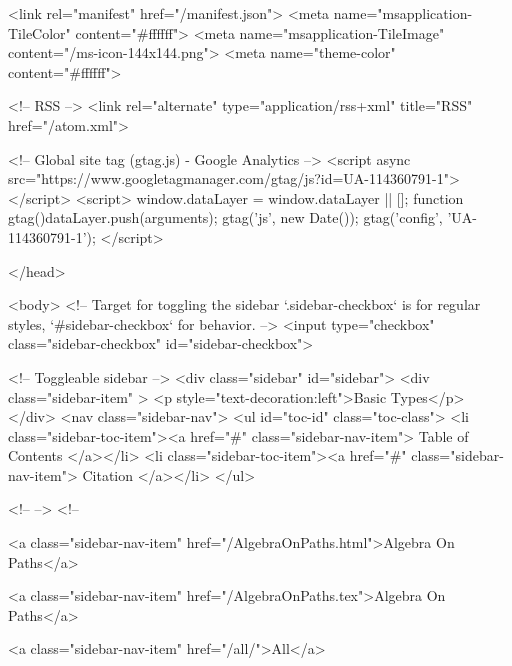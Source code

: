   <link rel="manifest" href="/manifest.json">
  <meta name="msapplication-TileColor" content="#ffffff">
  <meta name="msapplication-TileImage" content="/ms-icon-144x144.png">
  <meta name="theme-color" content="#ffffff">
  
  <!-- RSS -->
  <link rel="alternate" type="application/rss+xml" title="RSS" href="/atom.xml">

  <!-- Global site tag (gtag.js) - Google Analytics -->
  <script async src="https://www.googletagmanager.com/gtag/js?id=UA-114360791-1"></script>
  <script>
    window.dataLayer = window.dataLayer || [];
    function gtag(){dataLayer.push(arguments);}
    gtag('js', new Date());
    gtag('config', 'UA-114360791-1');
  </script>

  
</head>




  <body>
    <!-- Target for toggling the sidebar `.sidebar-checkbox` is for regular
     styles, `#sidebar-checkbox` for behavior. -->
<input type="checkbox" class="sidebar-checkbox" id="sidebar-checkbox">

<!-- Toggleable sidebar -->
<div class="sidebar" id="sidebar">
  <div class="sidebar-item" >
    <p style="text-decoration:left">Basic Types</p>
  </div>
  <nav class="sidebar-nav">
    <ul id="toc-id" class="toc-class">
  <li class="sidebar-toc-item"><a href="#" class="sidebar-nav-item"> Table of Contents </a></li>
  <li class="sidebar-toc-item"><a href="#" class="sidebar-nav-item"> Citation </a></li>
</ul>


    <!--  -->
    <!-- 
      
    
      
    
      
    
      
        
      
    
      
        
          <a class="sidebar-nav-item" href="/AlgebraOnPaths.html">Algebra On Paths</a>
        
      
    
      
        
          <a class="sidebar-nav-item" href="/AlgebraOnPaths.tex">Algebra On Paths</a>
        
      
    
      
        
          <a class="sidebar-nav-item" href="/all/">All</a>
        
      
    
      
        
